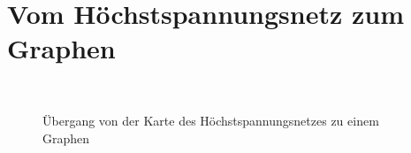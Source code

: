 \section{Vom Höchstspannungsnetz zum Graphen}
\label{Vom Höchstspannungsnetz zum Graphen}
%
\begin{figure}[t]
	\centering
	\hspace{1.0cm}%
	\\
	\caption[Übergang von der Karte des Höchstspannungsnetzes zu einem Graphen]{Übergang von der Karte des Höchstspannungsnetzes zu einem Graphen}
	\label{fig_testbild2}
\end{figure}



